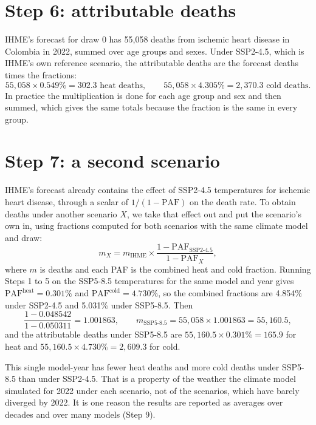 \documentclass[11pt]{ozreport}
\begin{document}
\section{Step 6: attributable deaths}

IHME's forecast for draw 0 has 55,058 deaths from ischemic heart disease in Colombia in 2022, summed over age groups and sexes. Under SSP2-4.5, which is IHME's own reference scenario, the attributable deaths are the forecast deaths times the fractions:
\[
  55{,}058 \times 0.549\% = 302.3 \text{ heat deaths}, \qquad 55{,}058 \times 4.305\% = 2{,}370.3 \text{ cold deaths}.
\]
In practice the multiplication is done for each age group and sex and then summed, which gives the same totals because the fraction is the same in every group.

\section{Step 7: a second scenario}

IHME's forecast already contains the effect of SSP2-4.5 temperatures for ischemic heart disease, through a scalar of $1/(1-\mathrm{PAF})$ on the death rate. To obtain deaths under another scenario $X$, we take that effect out and put the scenario's own in, using fractions computed for both scenarios with the same climate model and draw:
\begin{equation}
  m_X = m_{\text{IHME}} \times \frac{1 - \mathrm{PAF}_{\text{SSP2-4.5}}}{1 - \mathrm{PAF}_X},
\end{equation}
where $m$ is deaths and each PAF is the combined heat and cold fraction. Running Steps 1 to 5 on the SSP5-8.5 temperatures for the same model and year gives $\mathrm{PAF}^{\text{heat}} = 0.301\%$ and $\mathrm{PAF}^{\text{cold}} = 4.730\%$, so the combined fractions are 4.854\% under SSP2-4.5 and 5.031\% under SSP5-8.5. Then
\[
  \frac{1 - 0.048542}{1 - 0.050311} = 1.001863, \qquad m_{\text{SSP5-8.5}} = 55{,}058 \times 1.001863 = 55{,}160.5,
\]
and the attributable deaths under SSP5-8.5 are $55{,}160.5 \times 0.301\% = 165.9$ for heat and $55{,}160.5 \times 4.730\% = 2{,}609.3$ for cold.

This single model-year has fewer heat deaths and more cold deaths under SSP5-8.5 than under SSP2-4.5. That is a property of the weather the climate model simulated for 2022 under each scenario, not of the scenarios, which have barely diverged by 2022. It is one reason the results are reported as averages over decades and over many models (Step 9).
\end{document}
